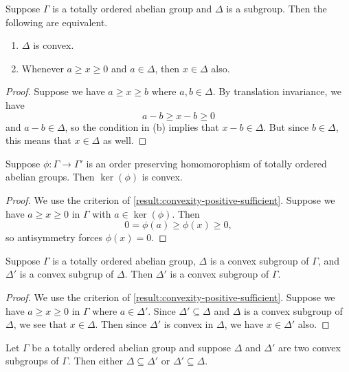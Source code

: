 \begin{lemma}
	\label{result:convexity-positive-sufficient}
	Suppose $\Gamma$ is a totally ordered abelian group and $\Delta$ is a subgroup. Then the following are equivalent.
	\begin{enumerate}[label=(\alph{*})]
		\item $\Delta$ is convex.
		\item Whenever $a \geq x \geq 0$ and $a \in \Delta$, then $x \in \Delta$ also. 
	\end{enumerate}
\end{lemma}

\begin{proof}
	Suppose we have $a \geq x \geq b$ where $a, b \in \Delta$. By translation invariance, we have 
	\[ a - b \geq x - b \geq 0 \]
	and $a - b \in \Delta$, so the condition in (b) implies that $x - b \in \Delta$. But since $b \in \Delta$, this means that $x \in \Delta$ as well. 
\end{proof}

\begin{lemma}
\label{result:kernels-convex}
Suppose $\phi : \Gamma \to \Gamma'$ is an order preserving homomorophism of totally ordered abelian groups. Then $\ker(\phi)$ is convex. 
\end{lemma}

\begin{proof}
We use the criterion of \cref{result:convexity-positive-sufficient}. Suppose we have $a \geq x \geq 0$ in $\Gamma$ with $a \in \ker(\phi)$. Then \[ 0 = \phi(a) \geq \phi(x) \geq 0,  \] so antisymmetry forces $\phi(x) = 0$. 
\end{proof}

\begin{lemma}
\label{result:convex-inside-convex}
Suppose $\Gamma$ is a totally ordered abelian group, $\Delta$ is a convex subgroup of $\Gamma$, and $\Delta'$ is a convex subgrup of $\Delta$. Then $\Delta'$ is a convex subgroup of $\Gamma$. 
\end{lemma}

\begin{proof}
We use the criterion of \cref{result:convexity-positive-sufficient}. Suppose we have $a \geq x \geq 0$ in $\Gamma$ where $a \in \Delta'$. Since $\Delta' \subseteq \Delta$ and $\Delta$ is a convex subgroup of $\Delta$, we see that $x \in \Delta$. Then since $\Delta'$ is convex in $\Delta$, we have $x \in \Delta'$ also. 
\end{proof}

\begin{lemma}
	\label{result:convex-subgroups-totally-ordered}
	Let $\Gamma$ be a totally ordered abelian group and suppose $\Delta$ and $\Delta'$ are two convex subgroups of $\Gamma$. Then either $\Delta \subseteq \Delta'$ or $\Delta' \subseteq \Delta$. 
\end{lemma}


